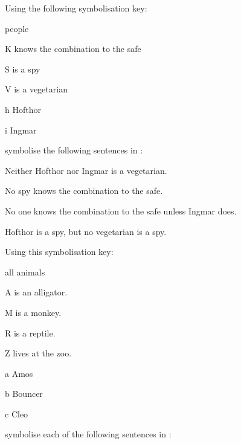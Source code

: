 \problempart
\label{pr.FOLvegetarians}
Using the following symbolisation key:
\begin{ekey}
\item[\text{domain}] people
\item[K\meta{x}]  knows the combination to the safe
\item[S\meta{x}]  is a spy
\item[V\meta{x}]  is a vegetarian
\item[h] Hofthor
\item[i] Ingmar
\end{ekey}
symbolise the following sentences in \FOL:
\begin{earg}
\item Neither Hofthor nor Ingmar is a vegetarian.
\item No spy knows the combination to the safe.
\item No one knows the combination to the safe unless Ingmar does.
\item Hofthor is a spy, but no vegetarian is a spy.
\end{earg}
\solutions
\problempart\label{pr.FOLalligators}
Using this symbolisation key:
\begin{ekey}
\item[\text{domain}] all animals
\item[A\meta{x}]  is an alligator.
\item[M\meta{x}]  is a monkey.
\item[R\meta{x}]  is a reptile.
\item[Z\meta{x}]  lives at the zoo.
\item[a] Amos
\item[b] Bouncer
\item[c] Cleo
\end{ekey}
symbolise each of the following sentences in \FOL:
